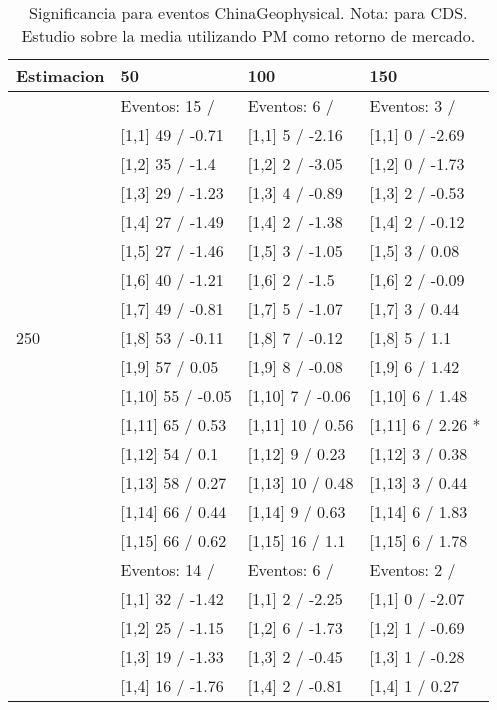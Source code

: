 \begin{table}

\caption{Significancia para eventos ChinaGeophysical. Nota: para CDS. Estudio sobre la media utilizando PM como retorno de mercado.}
\centering
\begin{tabular}[t]{llll}
\toprule
Estimacion & 50 & 100 & 150\\
\midrule
 & Eventos:  15 / & Eventos:  6 / & Eventos:  3 /\\
 & {}[1,1] 49  / -0.71 & {}[1,1] 5  / -2.16 & {}[1,1] 0  / -2.69\\
 & {}[1,2] 35  / -1.4 & {}[1,2] 2  / -3.05 & {}[1,2] 0  / -1.73\\
 & {}[1,3] 29  / -1.23 & {}[1,3] 4  / -0.89 & {}[1,3] 2  / -0.53\\
 & {}[1,4] 27  / -1.49 & {}[1,4] 2  / -1.38 & {}[1,4] 2  / -0.12\\
\addlinespace
 & {}[1,5] 27  / -1.46 & {}[1,5] 3  / -1.05 & {}[1,5] 3  / 0.08\\
 & {}[1,6] 40  / -1.21 & {}[1,6] 2  / -1.5 & {}[1,6] 2  / -0.09\\
 & {}[1,7] 49  / -0.81 & {}[1,7] 5  / -1.07 & {}[1,7] 3  / 0.44\\
250 & {}[1,8] 53  / -0.11 & {}[1,8] 7  / -0.12 & {}[1,8] 5  / 1.1\\
 & {}[1,9] 57  / 0.05 & {}[1,9] 8  / -0.08 & {}[1,9] 6  / 1.42\\
\addlinespace
 & {}[1,10] 55  / -0.05 & {}[1,10] 7  / -0.06 & {}[1,10] 6  / 1.48\\
 & {}[1,11] 65  / 0.53 & {}[1,11] 10  / 0.56 & {}[1,11] 6  / 2.26 *\\
 & {}[1,12] 54  / 0.1 & {}[1,12] 9  / 0.23 & {}[1,12] 3  / 0.38\\
 & {}[1,13] 58  / 0.27 & {}[1,13] 10  / 0.48 & {}[1,13] 3  / 0.44\\
 & {}[1,14] 66  / 0.44 & {}[1,14] 9  / 0.63 & {}[1,14] 6  / 1.83\\
\addlinespace
 & {}[1,15] 66  / 0.62 & {}[1,15] 16  / 1.1 & {}[1,15] 6  / 1.78\\
 & Eventos:  14 / & Eventos:  6 / & Eventos:  2 /\\
 & {}[1,1] 32  / -1.42 & {}[1,1] 2  / -2.25 & {}[1,1] 0  / -2.07\\
 & {}[1,2] 25  / -1.15 & {}[1,2] 6  / -1.73 & {}[1,2] 1  / -0.69\\
 & {}[1,3] 19  / -1.33 & {}[1,3] 2  / -0.45 & {}[1,3] 1  / -0.28\\
\addlinespace
 & {}[1,4] 16  / -1.76 & {}[1,4] 2  / -0.81 & {}[1,4] 1  / 0.27\\

\end{tabular}
\end{table}
